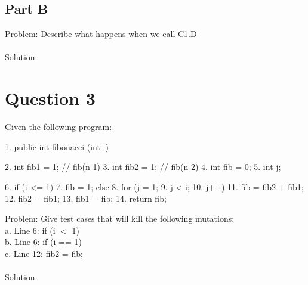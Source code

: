 \documentclass{article}
\begin{document}
\subsection*{Part B}
Problem: Describe what happens when we call C1.D \\\\
Solution:

\newpage

\section*{Question 3}
Given the following program:
\begin{spverbatim}
	1. public int fibonacci (int i) { 
	2.     int fib1 = 1;    // fib(n-1)
	3.     int fib2 = 1;    // fib(n-2)
	4.     int fib = 0;
	5.     int j;

	6.     if (i <= 1) 
	7.         fib = 1;
	       else 
	8.        for (j = 1;
	9.             j < i;
	10.             j++) {
	11.            fib = fib2 + fib1;
	12.            fib2 = fib1;
	13.            fib1 = fib;
	          }
	14.    return fib;		
	   }
\end{spverbatim} \bigskip
\noindent
Problem: Give test cases that will kill the following mutations: \\
a. Line 6: if (i $<$ 1)	\\
b. Line 6: if (i == 1)	\\
c. Line 12: fib2 = fib;	\\\\
Solution:
\end{document}
